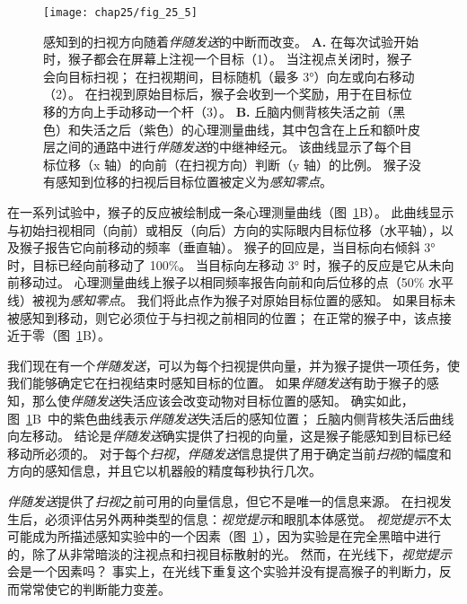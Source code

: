 \begin{figure}[htbp]
	\centering
	\texttt{[image: chap25/fig\_25\_5]}
	\caption{感知到的扫视方向随着\textit{伴随发送}的中断而改变。
		\textbf{A.} 在每次试验开始时，猴子都会在屏幕上注视一个目标（1）。
		当注视点关闭时，猴子会向目标扫视；
		在扫视期间，目标随机（最多 3°）向左或向右移动（2）。
		在扫视到原始目标后，猴子会收到一个奖励，用于在目标位移的方向上手动移动一个杆（3）。
		\textbf{B.} 丘脑内侧背核失活之前（黑色）和失活之后（紫色）的心理测量曲线，其中包含在上丘和额叶皮层之间的通路中进行\textit{伴随发送}的中继神经元。
		该曲线显示了每个目标位移（x 轴）的向前（在扫视方向）判断（y 轴）的比例。
		猴子没有感知到位移的扫视后目标位置被定义为\textit{感知零点}\cite{cavanaugh2016saccadic}。}
	\label{fig:25_5}
\end{figure}


在一系列试验中，猴子的反应被绘制成一条心理测量曲线（图~\ref{fig:25_5}B）。
此曲线显示与初始扫视相同（向前）或相反（向后）方向的实际眼内目标位移（水平轴），以及猴子报告它向前移动的频率（垂直轴）。
猴子的回应是，当目标向右倾斜 3° 时，目标已经向前移动了 100\%。
当目标向左移动 3° 时，猴子的反应是它从未向前移动过。
心理测量曲线上猴子以相同频率报告向前和向后位移的点（50\% 水平线）被视为\textit{感知零点}。
我们将此点作为猴子对原始目标位置的感知。
如果目标未被感知到移动，则它必须位于与扫视之前相同的位置；
在正常的猴子中，该点接近于零（图~\ref{fig:25_5}B）。


我们现在有一个\textit{伴随发送}，可以为每个扫视提供向量，并为猴子提供一项任务，使我们能够确定它在扫视结束时感知目标的位置。
如果\textit{伴随发送}有助于猴子的感知，那么使\textit{伴随发送}失活应该会改变动物对目标位置的感知。
确实如此，图~\ref{fig:25_5}B~中的紫色曲线表示\textit{伴随发送}失活后的感知位置；
丘脑内侧背核失活后曲线向左移动。
结论是\textit{伴随发送}确实提供了扫视的向量，这是猴子能感知到目标已经移动所必须的。
对于每个\textit{扫视}，\textit{伴随发送}信息提供了用于确定当前\textit{扫视}的幅度和方向的感知信息，并且它以机器般的精度每秒执行几次。


\textit{伴随发送}提供了\textit{扫视}之前可用的向量信息，但它不是唯一的信息来源。
在扫视发生后，必须评估另外两种类型的信息：\textit{视觉提示}和眼肌本体感觉。
\textit{视觉提示}不太可能成为所描述感知实验中的一个因素（图~\ref{fig:25_5}），因为实验是在完全黑暗中进行的，除了从非常暗淡的注视点和扫视目标散射的光。
然而，在光线下，\textit{视觉提示}会是一个因素吗？
事实上，在光线下重复这个实验并没有提高猴子的判断力，反而常常使它的判断能力变差。


